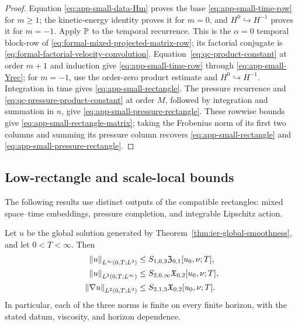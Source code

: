 \begin{proof}
Equation \eqref{eq:app-small-data-Hm} proves the base
\eqref{eq:app-small-time-row} for \(m\ge1\); the kinetic-energy identity
proves it for \(m=0\), and \(H^0\hookrightarrow H^{-1}\) proves it for
\(m=-1\).  Apply \(\mathbb P\) to the temporal recurrence.
This is the \(\alpha=0\) temporal block-row of
\eqref{eq:formal-mixed-projected-matrix-row}; its factorial conjugate is
\eqref{eq:formal-factorial-velocity-convolution}.
Equation~\eqref{eq:qc-product-constant} at order \(m+1\) and induction give
\eqref{eq:app-small-time-row} through
\eqref{eq:app-small-Yrec}; for \(m=-1\), use the order-zero product
estimate and \(H^0\hookrightarrow H^{-1}\).  Integration in time gives
\eqref{eq:app-small-rectangle}.  The pressure recurrence and
\eqref{eq:qc-pressure-product-constant} at order \(M\), followed by
integration and summation in \(n\), give
\eqref{eq:app-small-pressure-rectangle}.  These rowwise bounds give
\eqref{eq:app-small-rectangle-matrix}; taking the Frobenius norm of its first
two columns and summing its pressure column recovers
\eqref{eq:app-small-rectangle} and
\eqref{eq:app-small-pressure-rectangle}.
\end{proof}

\subsection{Low-rectangle and scale-local bounds}

The following results use distinct outputs of the compatible rectangles:
mixed space--time embeddings, pressure completion, and integrable Lipschitz
action.

\begin{proposition}
\label{prop:app-low-rectangle-classes}
Let \(u\) be the global solution generated by
Theorem~\ref{thm:ier-global-smoothness}, and let \(0<T<\infty\).  Then
\begin{align}
 \left\lVert u\right\rVert_{L^\infty(0,T;L^3)}
 &\le S_{1,0,3}\mathfrak Z_{0,1}[u_0,\nu;T],
 \label{eq:app-LinfL3}\\
 \left\lVert u\right\rVert_{L^2(0,T;L^\infty)}
 &\le S_{2,0,\infty}\mathfrak X_{0,2}[u_0,\nu;T],
 \label{eq:app-L2Linfty}\\
 \left\lVert \nabla u\right\rVert_{L^2(0,T;L^3)}
 &\le S_{2,1,3}\mathfrak X_{0,2}[u_0,\nu;T].
 \label{eq:app-grad-L2L3}
\end{align}
In particular, each of the three norms is finite on every finite horizon,
with the stated datum, viscosity, and horizon dependence.
\end{proposition}

